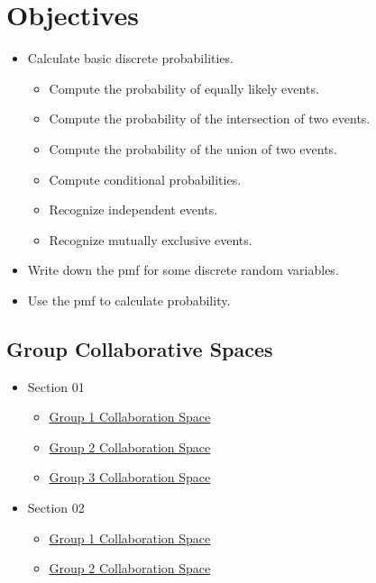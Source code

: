 \documentclass{article}
\theoremstyle{plain}
\theoremstyle{box}
\begin{document}
\section{Objectives}
\begin{itemize}
\item Calculate basic discrete probabilities.
	\begin{itemize}
	\item Compute the probability of equally likely events.
	\item Compute the probability of the intersection of two events.
	\item Compute the probability of the union of two events.
	\item Compute conditional probabilities.
	\item Recognize independent events.
	\item Recognize mutually exclusive events.
	\end{itemize}
\item Write down the pmf for some discrete random variables.
\item Use the pmf to calculate probability.
\end{itemize}
\subsection{Group Collaborative Spaces}
\begin{itemize}
\item Section 01
\begin{itemize}
\item \href{https://docs.google.com/document/d/1qphjKMfvf8ZYyWgxmPa8aR2uxxuY0OsACZgBQU16K-M/edit?usp=sharing}{Group 1 Collaboration Space}
\item \href{https://docs.google.com/document/d/1fO_BrHFA-t3y8tcKkPVKwctZH11N1Q1KoPfUf_HA55E/edit?usp=sharing}{Group 2 Collaboration Space}
\item \href{https://docs.google.com/document/d/1kP8tFnS9bRtFdNE6igO5XWp8jiEyH2SZUNBEGfZ5iis/edit?usp=sharing}{Group 3 Collaboration Space}
\end{itemize}
\item Section 02
\begin{itemize}
\item \href{https://docs.google.com/document/d/12h8t5T-amdit0sv4IV7YdSRlPrWIpbOd1DPqB-ygvQA/edit?usp=sharing}{Group 1 Collaboration Space}
\item \href{https://docs.google.com/document/d/1wzOKAlH0lwUrYuI6OBgbbvopKUznyT5rJF9nrlCT7gg/edit?usp=sharing}{Group 2 Collaboration Space}
\end{itemize}
\end{itemize}
\end{document}
